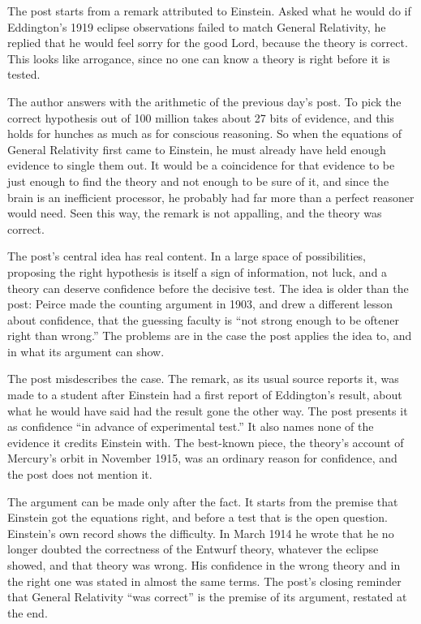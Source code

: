 \begin{afterword}
\summaryhead

The post starts from a remark attributed to Einstein. Asked what he would do if Eddington's 1919 eclipse observations failed to match General Relativity, he replied that he would feel sorry for the good Lord, because the theory is correct. This looks like arrogance, since no one can know a theory is right before it is tested.

The author answers with the arithmetic of the previous day's post. To pick the correct hypothesis out of 100 million takes about 27 bits of evidence, and this holds for hunches as much as for conscious reasoning. So when the equations of General Relativity first came to Einstein, he must already have held enough evidence to single them out. It would be a coincidence for that evidence to be just enough to find the theory and not enough to be sure of it, and since the brain is an inefficient processor, he probably had far more than a perfect reasoner would need. Seen this way, the remark is not appalling, and the theory was correct.

\responsehead

The post's central idea has real content. In a large space of possibilities, proposing the right hypothesis is itself a sign of information, not luck, and a theory can deserve confidence before the decisive test. The idea is older than the post: Peirce made the counting argument in 1903, and drew a different lesson about confidence, that the guessing faculty is ``not strong enough to be oftener right than wrong.'' The problems are in the case the post applies the idea to, and in what its argument can show.

The post misdescribes the case. The remark, as its usual source reports it, was made to a student after Einstein had a first report of Eddington's result, about what he would have said had the result gone the other way. The post presents it as confidence ``in advance of experimental test.'' It also names none of the evidence it credits Einstein with. The best-known piece, the theory's account of Mercury's orbit in November 1915, was an ordinary reason for confidence, and the post does not mention it.

The argument can be made only after the fact. It starts from the premise that Einstein got the equations right, and before a test that is the open question. Einstein's own record shows the difficulty. In March 1914 he wrote that he no longer doubted the correctness of the Entwurf theory, whatever the eclipse showed, and that theory was wrong. His confidence in the wrong theory and in the right one was stated in almost the same terms. The post's closing reminder that General Relativity ``was correct'' is the premise of its argument, restated at the end.


\end{afterword}
